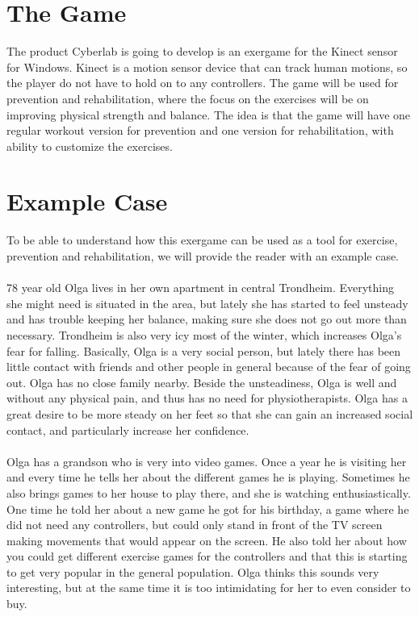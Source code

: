 \section{The Game}
The product Cyberlab is going to develop is an exergame for the Kinect sensor for Windows. Kinect is a motion sensor device that can track human motions, so the player do not have to hold on to any controllers. The game will be used for prevention and rehabilitation, where the focus on the exercises will be on improving physical strength and balance. The idea is that the game will have one regular workout version for prevention and one version for rehabilitation, with ability to customize the exercises. 

\section{Example Case}
To be able to understand how this exergame can be used as a tool for exercise, prevention and rehabilitation, we will provide the reader with an example case. \\ \\
78 year old Olga lives in her own apartment in central Trondheim. Everything she might need is situated in the area, but lately she has started  to feel unsteady and has trouble keeping her balance, making sure she does not go out more than necessary. Trondheim is also very icy most of the winter, which increases Olga's fear for falling. Basically, Olga is a very social person, but lately there has been little contact with friends and other people in general because of the fear of going out. Olga has no close family nearby. Beside the unsteadiness, Olga is well and without any physical pain, and thus has no need for physiotherapists. Olga has a great desire to be more steady on her feet so that she can gain an increased social contact, and particularly increase her confidence. \\ \\
Olga has a grandson who is very into video games. Once a year he is visiting her and every time he tells her about the different games he is playing. Sometimes he also brings games to her house to play there, and she is watching enthusiastically. One time he told her about a new game he got for his birthday, a game where he did not need any controllers, but could only stand in front of the TV screen making movements that would appear on the screen. He also told her about how you could get different exercise games for the controllers and that this is starting to get very popular in the general population. Olga thinks this sounds very interesting, but at the same time it is too intimidating for her to even consider to buy.   \\ \\

